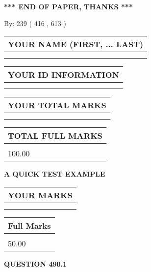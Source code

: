 \documentclass[12pt]{article}
\begin{document}
\vspace{1.0in} 
{\textbf{\large{ *** END OF PAPER, THANKS *** }}} 
   
   
\hspace{1.0in} By: 
 239 ( 416 ,  613 )
   
   
   
   
\newpage 
\setcounter{page}{ 
   490001 } 
   
   
   
   
\noindent\begin{tabular}{|l|}
\hline
YOUR NAME (FIRST, ... LAST)  \\
\hline
 \\ 
 \\ 
\hline
\end{tabular}
\hspace{0.05in} \begin{tabular}{|l|}
\hline
 YOUR   ID   INFORMATION  \\
\hline
 \\ 
 \\ 
\hline
\end{tabular}
   
   
\vspace{0.2in}\noindent\begin{tabular}{|l|}
\hline
YOUR TOTAL MARKS  \\
\hline
 \\ 
 \\ 
\hline
\end{tabular}
\hspace{0.05in} \begin{tabular}{|l|}
\hline
TOTAL FULL MARKS  \\
\hline
 \\ 
100.00 \\
\hline
\end{tabular}
   
   
 \vspace{0.2in}
{\LARGE {\textbf{ A QUICK TEST EXAMPLE}}}
   
   
  
\vspace{0.2in}
  
\noindent\begin{tabular}{|l|}
\hline
 YOUR MARKS  \\
\hline
 \\ 
 \\ 
\hline
\end{tabular}
\hspace{0.05in} \begin{tabular}{|l|}
\hline
 Full Marks  \\
\hline
 \\ 
50.00 \\
\hline
\end{tabular}
{\textbf{\Large{QUESTION
490.1 
}}}
  
\end{document}
